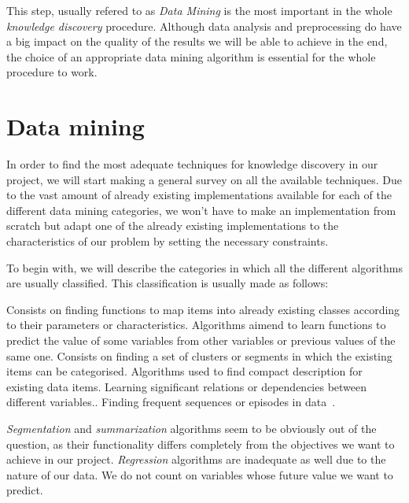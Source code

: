 \documentclass[a4paper,12pt]{article}
\begin{document}
This step, usually refered to as \emph{Data Mining} is the most important in the whole \emph{knowledge discovery} procedure. Although data analysis and preprocessing do have a big impact on the quality of the results we will be able to achieve in the end, the choice of an appropriate data mining algorithm is essential for the whole procedure to work.

\section{Data mining} 
\label{sec:datamining}
In order to find the most adequate techniques for knowledge discovery in our project, we will start making a general survey on all the available techniques. Due to the vast amount of already existing implementations available for each of the different data mining categories, we won't have to make an implementation from scratch but adapt one of the already existing implementations to the characteristics of our problem by setting the necessary constraints.

To begin with, we will describe the categories in which all the different algorithms are usually classified. This classification is usually made as follows:

\begin{enumerate}
  Consists on finding functions to map items into already existing classes according to their parameters or characteristics.
  Algorithms aimend to learn functions to predict the value of some variables from other variables or previous values of the same one.
  Consists on finding a set of clusters or segments in which the existing items can be categorised.
  Algorithms used to find compact description for existing data items.
  Learning significant relations or dependencies between different variables.\cite{Zhao2003association}.
  Finding frequent sequences or episodes in data~\cite{zhao2003sequential,weiss2002predicting}.
\end{enumerate}

\emph{Segmentation} and \emph{summarization} algorithms seem to be obviously out of the question, as their functionality differs completely from the objectives we want to achieve in our project. \emph{Regression} algorithms are inadequate as well due to the nature of our data. We do not count on variables whose future value we want to predict.
\end{document}
